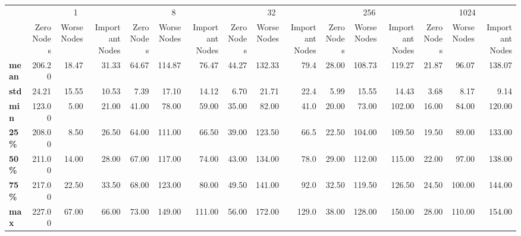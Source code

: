 \begin{tabular}{lrrrrrrrrrrrrrrr}
\toprule
{} & \multicolumn{3}{c}{1} & \multicolumn{3}{c}{8} & \multicolumn{3}{c}{32} & \multicolumn{3}{c}{256} & \multicolumn{3}{c}{1024} \\
{} & Zero Nodes & Worse Nodes & Important Nodes & Zero Nodes & Worse Nodes & Important Nodes & Zero Nodes & Worse Nodes & Important Nodes & Zero Nodes & Worse Nodes & Important Nodes & Zero Nodes & Worse Nodes & Important Nodes \\
\midrule
\textbf{mean} &     206.20 &       18.47 &           31.33 &      64.67 &      114.87 &           76.47 &      44.27 &      132.33 &            79.4 &      28.00 &      108.73 &          119.27 &      21.87 &       96.07 &          138.07 \\
\textbf{std } &      24.21 &       15.55 &           10.53 &       7.39 &       17.10 &           14.12 &       6.70 &       21.71 &            22.4 &       5.99 &       15.55 &           14.43 &       3.68 &        8.17 &            9.14 \\
\textbf{min } &     123.00 &        5.00 &           21.00 &      41.00 &       78.00 &           59.00 &      35.00 &       82.00 &            41.0 &      20.00 &       73.00 &          102.00 &      16.00 &       84.00 &          120.00 \\
\textbf{25\% } &     208.00 &        8.50 &           26.50 &      64.00 &      111.00 &           66.50 &      39.00 &      123.50 &            66.5 &      22.50 &      104.00 &          109.50 &      19.50 &       89.00 &          133.00 \\
\textbf{50\% } &     211.00 &       14.00 &           28.00 &      67.00 &      117.00 &           74.00 &      43.00 &      134.00 &            78.0 &      29.00 &      112.00 &          115.00 &      22.00 &       97.00 &          138.00 \\
\textbf{75\% } &     217.00 &       22.50 &           33.50 &      68.00 &      123.00 &           80.00 &      49.50 &      141.00 &            92.0 &      32.50 &      119.50 &          126.50 &      24.50 &      100.00 &          144.00 \\
\textbf{max } &     227.00 &       67.00 &           66.00 &      73.00 &      149.00 &          111.00 &      56.00 &      172.00 &           129.0 &      38.00 &      128.00 &          150.00 &      28.00 &      110.00 &          154.00 \\
\bottomrule
\end{tabular}
